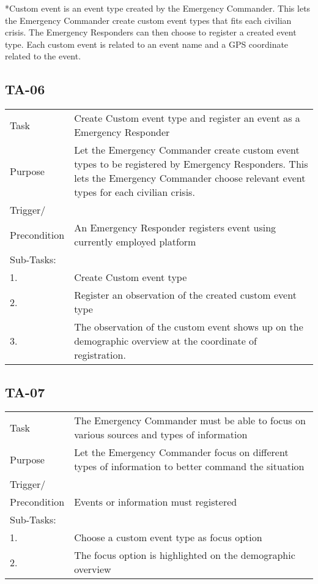 *Custom event is an event type created by the Emergency Commander. This lets the Emergency Commander create custom event types that fits each civilian crisis. The Emergency Responders can then choose to register a created event type. Each custom event is related to an event name and a GPS coordinate related to the event.


\subsection{TA-06}
\begin{longtable}{| p{2.5cm}  | p{10cm} |  }
	\hline
	Task & Create Custom event type and register an event as a Emergency Responder \\
	Purpose & Let the Emergency Commander create custom event types to be registered by Emergency Responders. This lets the Emergency Commander choose relevant event types for each civilian crisis.  \\
	Trigger/ &  \\Precondition & An  Emergency Responder registers event using currently employed platform \\
	\hline
	Sub-Tasks: & \\
	1. & Create Custom event type \\
	2. & Register an observation of the created custom event type \\
	3. & The observation of the custom event shows up on the demographic overview at the coordinate of registration. \\
	\hline
\end{longtable}

\newpage
\subsection{TA-07}
\begin{longtable}{| p{2.5cm}  | p{10cm} |  }
	\hline
	Task & The Emergency Commander must be able to focus on various sources and types of information  \\
	Purpose & Let the Emergency Commander focus on different types of information to better command the situation \\
	Trigger/ &  \\ Precondition & Events or information must registered \\
	\hline
	Sub-Tasks: & \\
	1. & Choose a custom event type as focus option \\
		\hline
	2. & The focus option is highlighted on the demographic overview \\
	\hline
\end{longtable}

